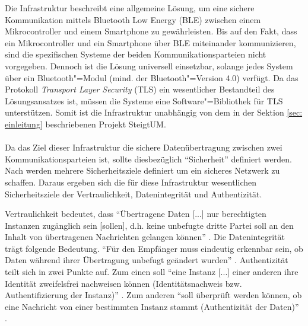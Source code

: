 Die Infrastruktur beschreibt eine allgemeine Lösung, um eine sichere Kommunikation mittels Bluetooth Low Energy (BLE) zwischen einem Mikrocontroller und einem Smartphone zu gewährleisten. Bis auf den Fakt, dass ein Mikrocontroller und ein Smartphone über BLE miteinander kommunizieren, sind die spezifischen Systeme der beiden Kommunikationsparteien nicht vorgegeben. Dennoch ist die Lösung universell einsetzbar, solange jedes System über ein Bluetooth"=Modul (mind. der Bluetooth"=Version 4.0) verfügt. Da das Protokoll \textit{Transport Layer Security} (TLS) ein wesentlicher Bestandteil des Lösungsansatzes ist, müssen die Systeme eine Software"=Bibliothek für TLS unterstützen. Somit ist die Infrastruktur unabhängig von dem in der Sektion \ref{sec: einleitung} beschriebenen Projekt SteigtUM.
\\\\
Da das Ziel dieser Infrastruktur die sichere Datenübertragung zwischen zwei Kommunikationsparteien ist, sollte diesbezüglich "`Sicherheit"' definiert werden. Nach \cite{Bless2005_19-20} werden mehrere Sicherheitsziele definiert um ein sicheres Netzwerk zu schaffen. Daraus ergeben sich die für diese Infrastruktur wesentlichen Sicherheitsziele der Vertraulichkeit, Datenintegrität und Authentizität.

Vertraulichkeit bedeutet, dass "`Übertragene Daten [...] nur berechtigten Instanzen zugänglich sein [sollen], d.h. keine unbefugte dritte Partei soll an den Inhalt von übertragenen Nachrichten gelangen können"' \cite{Bless2005_19}.
Die Datenintegrität trägt folgende Bedeutung. "`Für den Empfänger muss eindeutig erkennbar sein, ob Daten während ihrer Übertragung unbefugt geändert wurden"' \cite{Bless2005_19}.
Authentizität teilt sich in zwei Punkte auf. Zum einen soll "`eine Instanz [...] einer anderen ihre Identität zweifelsfrei nachweisen können (Identitätsnachweis bzw. Authentifizierung der Instanz)"' \cite{Bless2005_19}. 
Zum anderen "`soll überprüft werden können, ob eine Nachricht von einer bestimmten Instanz stammt (Authentizität der Daten)"' \cite{Bless2005_19}.
